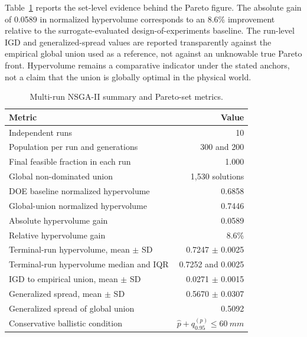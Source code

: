 \documentclass[12pt]{elsarticle}
\newcommand{\SI}[2]{#1~#2}
\newif\ifproductionnotes
\newcommand{\productionnote}[1]{%
\ifproductionnotes
\par\medskip\noindent\fcolorbox{black}{gray!12}{\begin{minipage}{0.94\linewidth}\footnotesize\textbf{Production note for the figure/table designer.} #1\end{minipage}}\par\medskip
\fi}
\begin{document}
	Table~\ref{tab:pareto_metrics} reports the set-level evidence behind the Pareto figure. The absolute gain of 0.0589 in normalized hypervolume corresponds to an 8.6\% improvement relative to the surrogate-evaluated design-of-experiments baseline. The run-level IGD and generalized-spread values are reported transparently against the empirical global union used as a reference, not against an unknowable true Pareto front. Hypervolume remains a comparative indicator under the stated anchors, not a claim that the union is globally optimal in the physical world.

	\begin{table}[htbp]
		\centering
		\caption{Multi-run NSGA-II summary and Pareto-set metrics.}
		\label{tab:pareto_metrics}
		\small
		\begin{tabular}{@{}lr@{}}
			\toprule
			Metric & Value \\
			\midrule
			Independent runs & 10 \\
			Population per run and generations & 300 and 200 \\
			Final feasible fraction in each run & 1.000 \\
			Global non-dominated union & 1,530 solutions \\
			DOE baseline normalized hypervolume & 0.6858 \\
			Global-union normalized hypervolume & 0.7446 \\
			Absolute hypervolume gain & 0.0589 \\
			Relative hypervolume gain & 8.6\% \\
			Terminal-run hypervolume, mean $\pm$ SD & 0.7247 $\pm$ 0.0025 \\
			Terminal-run hypervolume median and IQR & 0.7252 and 0.0025 \\
			IGD to empirical union, mean $\pm$ SD & 0.0271 $\pm$ 0.0015 \\
			Generalized spread, mean $\pm$ SD & 0.5670 $\pm$ 0.0307 \\
			Generalized spread of global union & 0.5092 \\
			Conservative ballistic condition & $\hat{p}+q_{0.95}^{(p)}\leq\SI{60}{mm}$ \\
			\bottomrule
		\end{tabular}
	\end{table}
	\productionnote{\textbf{Tabela~\ref{tab:pareto_metrics} e Figura~\ref{fig:pareto} --- briefing para Carlos.} Usar \texttt{Fase 4/resultados\_otimizacao (Fase 4) - MCNP63\_DEDF\_AP/fase4\_20261003\_043316/resumo\_final\_fase4.json}, \texttt{resumo\_runs.csv}, \texttt{pareto\_union\_multirun.csv}, \texttt{pareto\_quality\_multirun.csv} e \texttt{convergencia\_todos\_runs.csv}. Refazer a figura como composi\c{c}\~ao coordenada em dois pain\'eis: vista 3D ou triangular de dose, massa e custo com os 30 candidatos destacados discretamente, mais painel de converg\^encia do hipervolume com as dez sementes em linhas claras e a mediana em linha forte. Explicar em legenda que IGD e spread usam a uni\~ao global emp\'irica como refer\^encia, n\~ao a frente verdadeira desconhecida.}
\end{document}
